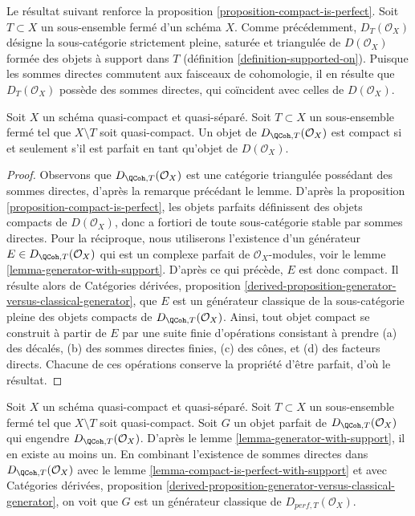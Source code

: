 \noindent
Le résultat suivant renforce la
proposition \ref{proposition-compact-is-perfect}.
Soit $T \subset X$ un sous-ensemble fermé d'un schéma $X$. Comme précédemment,
$D_T(\mathcal{O}_X)$ désigne la sous-catégorie strictement pleine, saturée
et triangulée de $D(\mathcal{O}_X)$ formée des objets
à support dans $T$ (définition \ref{definition-supported-on}).
Puisque les sommes directes commutent aux faisceaux de cohomologie, il en résulte
que $D_T(\mathcal{O}_X)$ possède des sommes directes, qui coïncident
avec celles de $D(\mathcal{O}_X)$.

\begin{lemma}
\label{lemma-compact-is-perfect-with-support}
Soit $X$ un schéma quasi-compact et quasi-séparé.
Soit $T \subset X$ un sous-ensemble fermé tel que $X \setminus T$
soit quasi-compact. Un objet de $D_{\QCoh, T}(\mathcal{O}_X)$ est compact
si et seulement s'il est parfait en tant qu'objet de $D(\mathcal{O}_X)$.
\end{lemma}

\begin{proof}
Observons que $D_{\QCoh, T}(\mathcal{O}_X)$ est une catégorie triangulée
possédant des sommes directes, d'après la remarque précédant le lemme.
D'après la proposition \ref{proposition-compact-is-perfect},
les objets parfaits définissent des objets compacts de $D(\mathcal{O}_X)$,
donc a fortiori de toute sous-catégorie stable par sommes
directes. Pour la réciproque, nous utiliserons l'existence d'un générateur
$E \in D_{\QCoh, T}(\mathcal{O}_X)$ qui est un complexe parfait
de $\mathcal{O}_X$-modules, voir le
lemme \ref{lemma-generator-with-support}.
D'après ce qui précède, $E$ est donc compact. Il résulte alors de
Catégories dérivées, proposition
\ref{derived-proposition-generator-versus-classical-generator},
que $E$ est un générateur classique de la sous-catégorie pleine
des objets compacts de $D_{\QCoh, T}(\mathcal{O}_X)$.
Ainsi, tout objet compact se construit à partir de $E$ par
une suite finie d'opérations consistant à prendre
(a) des décalés, (b) des sommes directes finies, (c) des cônes, et
(d) des facteurs directs. Chacune de ces opérations conserve
la propriété d'être parfait, d'où le résultat.
\end{proof}

\begin{remark}
\label{remark-classical-generator-with-support}
Soit $X$ un schéma quasi-compact et quasi-séparé.
Soit $T \subset X$ un sous-ensemble fermé tel que $X \setminus T$
soit quasi-compact. Soit $G$ un
objet parfait de $D_{\QCoh, T}(\mathcal{O}_X)$ qui engendre
$D_{\QCoh, T}(\mathcal{O}_X)$. D'après le lemme \ref{lemma-generator-with-support},
il en existe au moins un. En combinant l'existence de sommes directes dans
$D_{\QCoh, T}(\mathcal{O}_X)$ avec le
lemme \ref{lemma-compact-is-perfect-with-support} et avec
Catégories dérivées, proposition
\ref{derived-proposition-generator-versus-classical-generator},
on voit que $G$ est un générateur classique de $D_{perf, T}(\mathcal{O}_X)$.
\end{remark}

